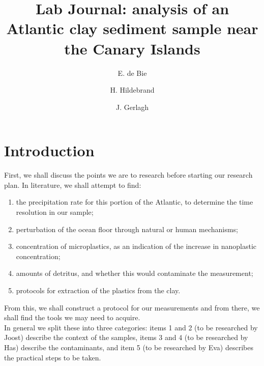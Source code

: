 \documentclass[twocolumn,a4paper,aps,amsmath,amssymb,floatfix,superscriptaddress]{revtex4-2}
\begin{document}
	
	\title{Lab Journal: analysis of an Atlantic clay sediment sample near the Canary Islands}
	\author{E. de Bie}
	
	\author{H. Hildebrand}
	
	\author{J. Gerlagh}
	\maketitle
	
	\section{Introduction}
	First, we shall discuss the points we are to research before starting our research plan. 
	In literature, we shall attempt to find:
	\begin{enumerate}
		\item the precipitation rate for this portion of the Atlantic, to determine the time resolution in our sample;
		\item perturbation of the ocean floor through natural or human mechanisms;
		\item concentration of microplastics, as an indication of the increase in nanoplastic concentration;
		\item amounts of detritus, and whether this would contaminate the measurement;
		\item protocols for extraction of the plastics from the clay.
	\end{enumerate}
	From this, we shall construct a protocol for our measurements and from there, we shall find the tools we may need to acquire.\\
	In general we split these into three categories: items 1 and 2 (to be researched by Joost) describe the context of the samples, items 3 and 4 (to be researched by Has) describe the contaminants, and item 5 (to be researched by Eva) describes the practical steps to be taken.
	
\end{document}
